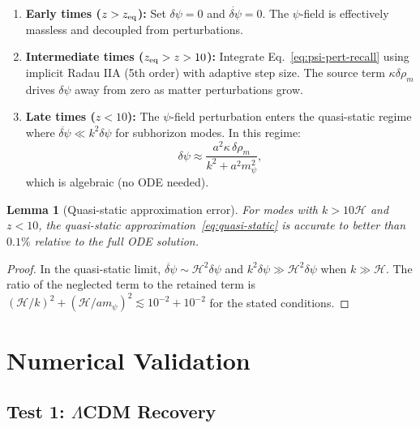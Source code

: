 \documentclass[11pt,a4paper]{article}
\newtheorem{lemma}[theorem]{Lemma}
\theoremstyle{remark}
\begin{document}
\begin{enumerate}
\item \textbf{Early times ($z > z_{\rm eq}$):} Set $\delta\psi = 0$ and
  $\dot{\delta\psi} = 0$. The $\psi$-field is effectively massless and
  decoupled from perturbations.

\item \textbf{Intermediate times ($z_{\rm eq} > z > 10$):} Integrate
  Eq.~\eqref{eq:psi-pert-recall} using implicit Radau IIA (5th order)
  with adaptive step size. The source term $\kappa\delta\rho_m$ drives
  $\delta\psi$ away from zero as matter perturbations grow.

\item \textbf{Late times ($z < 10$):} The $\psi$-field perturbation
  enters the quasi-static regime where $\ddot{\delta\psi} \ll k^2\delta\psi$
  for subhorizon modes. In this regime:
  \begin{equation}
  \delta\psi \approx \frac{a^2\kappa\,\delta\rho_m}{k^2 + a^2 m_\psi^2},
  \label{eq:quasi-static}
  \end{equation}
  which is algebraic (no ODE needed).
\end{enumerate}

\begin{lemma}[Quasi-static approximation error]
\label{lem:quasi-static}
For modes with $k > 10\mathcal{H}$ and $z < 10$, the quasi-static
approximation~\eqref{eq:quasi-static} is accurate to better than
$0.1\%$ relative to the full ODE solution.
\end{lemma}

\begin{proof}
In the quasi-static limit, $\ddot{\delta\psi} \sim \mathcal{H}^2\delta\psi$
and $k^2\delta\psi \gg \mathcal{H}^2\delta\psi$ when $k \gg \mathcal{H}$.
The ratio of the neglected term to the retained term is
$(\mathcal{H}/k)^2 + (\mathcal{H}/am_\psi)^2 \lesssim 10^{-2} + 10^{-2}$
for the stated conditions.
\end{proof}

\section{Numerical Validation}

\subsection{Test 1: $\Lambda$CDM Recovery}
\end{document}

